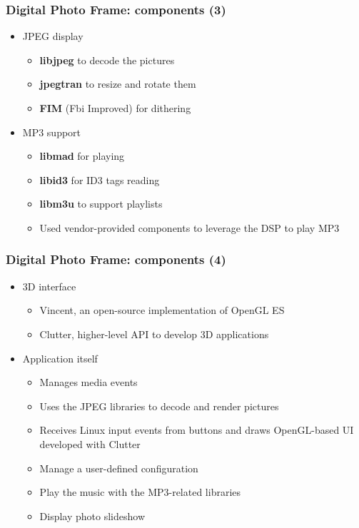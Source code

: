 \begin{frame}
  \frametitle{Digital Photo Frame: components (3)}
  \begin{itemize}
  \item JPEG display
    \begin{itemize}
    \item {\bf libjpeg} to decode the pictures
    \item {\bf jpegtran} to resize and rotate them
    \item {\bf FIM} (Fbi Improved) for dithering
    \end{itemize}
  \item MP3 support
    \begin{itemize}
    \item {\bf libmad} for playing
    \item {\bf libid3} for ID3 tags reading
    \item {\bf libm3u} to support playlists
    \item Used vendor-provided components to leverage the DSP to play
      MP3
    \end{itemize}
  \end{itemize}
\end{frame}

\begin{frame}
  \frametitle{Digital Photo Frame: components (4)}
  \begin{itemize}
  \item 3D interface
    \begin{itemize}
    \item Vincent, an open-source implementation of OpenGL ES
    \item Clutter, higher-level API to develop 3D applications
    \end{itemize}
  \item Application itself
    \begin{itemize}
    \item Manages media events
    \item Uses the JPEG libraries to decode and render pictures
    \item Receives Linux input events from buttons and draws
      OpenGL-based UI developed with Clutter
    \item Manage a user-defined configuration
    \item Play the music with the MP3-related libraries
    \item Display photo slideshow
    \end{itemize}
  \end{itemize}
\end{frame}

